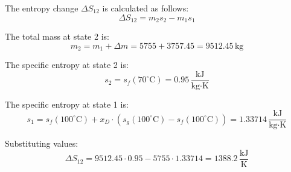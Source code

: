 The entropy change \( \Delta S_{12} \) is calculated as follows:  
\[
\Delta S_{12} = m_2 s_2 - m_1 s_1
\]  

The total mass at state 2 is:  
\[
m_2 = m_1 + \Delta m = 5755 + 3757.45 = 9512.45 \, \text{kg}
\]  

The specific entropy at state 2 is:  
\[
s_2 = s_f(70^\circ\text{C}) = 0.95 \, \frac{\text{kJ}}{\text{kg·K}}
\]  

The specific entropy at state 1 is:  
\[
s_1 = s_f(100^\circ\text{C}) + x_D \cdot (s_g(100^\circ\text{C}) - s_f(100^\circ\text{C})) = 1.33714 \, \frac{\text{kJ}}{\text{kg·K}}
\]  

Substituting values:  
\[
\Delta S_{12} = 9512.45 \cdot 0.95 - 5755 \cdot 1.33714 = 1388.2 \, \frac{\text{kJ}}{\text{K}}
\]